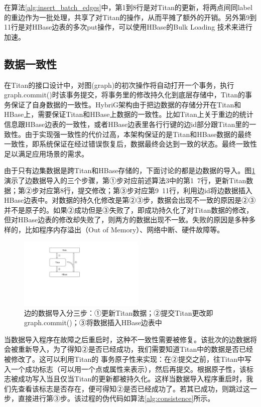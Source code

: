 在算法\ref{alg:insert_batch_edges}中，第1到8行是对Titan的更新，将两点间同label的重边作为一批处理，共享了对Titan的操作，从而平摊了额外的开销。另外第9到11行是对HBase边表的多次put操作，可以使用HBase的Bulk Loading 技术来进行加速。

\subsection{数据一致性}
在Titan的接口设计中，对图(graph)的初次操作将自动打开一个事务，执行graph.commit()时该事务提交，将事务里的修改持久化到底层存储中，Titan的事务保证了自身数据的一致性。HybriG架构由于把边数据的存储分开在Titan和HBase上，需要保证Titan和HBase上数据的一致性。比如Titan上关于重边的统计信息跟HBase边表的一致性，或者HBase边表里各行行键的边id部分跟Titan里的一致性。由于实现强一致性的代价过高，本架构保证的是Titan和HBase数据的最终一致性\supercite{eventually_consistent}，即系统保证在经过错误恢复后，数据最终会达到一致的状态。最终一致性足以满足应用场景的需求。

由于只有边集数据是跨Titan和HBase存储的，下面讨论的都是边数据的导入。图\ref{fig:insert_steps}演示了边数据导入的三个步骤，第①步对应前述算法3中的第1~7行，更新Titan数据；第②步对应第8行，提交修改；第③步对应第9~11行，利用边id将边数据插入HBase边表中。对数据的持久化修改是第②③步，数据会出现不一致的原因是②③并不是原子的。如果②成功但是③失败了，即成功持久化了对Titan数据的修改，但对HBase边表的修改却失败了，则两方的数据出现不一致。失败的原因是多种多样的，比如程序内存溢出（Out of Memory）、网络中断、硬件故障等。

\begin{figure}[htbp]
\centering
\includegraphics[width=60mm]{fig/insert_steps.pdf}
\caption{边的数据导入分三步：①更新Titan数据；②提交Titan更改即graph.commit()；③将数据插入HBase边表中}
\label{fig:insert_steps}
\end{figure}

当数据导入程序在故障之后重启时，这种不一致性需要被修复。该批次的边数据将会被重新导入，为了得知②是否已经成功，我们需要知道Titan中的数据是否已经被修改了。这可以利用Titan的
事务原子性来实现：在②提交之前，往Titan中写入一个成功标志（可以用一个点或属性来表示），然后再提交。根据原子性，该标志被成功写入当且仅当Titan的更新都被持久化。这样当数据导入程序重启时，我们先查看该标志是否存在，便可得知②是否已经成功了。若其已成功，则跳过这一步，直接进行第③步。该过程的伪代码如算法\ref{alg:consistence}所示。

